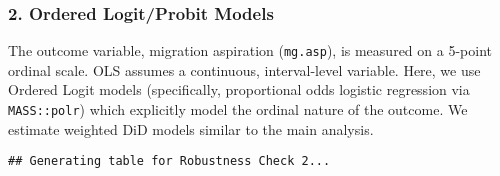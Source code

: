 \documentclass[
]{article}
\begin{document}
\subsubsection{2. Ordered Logit/Probit
Models}\label{ordered-logitprobit-models}

The outcome variable, migration aspiration (\texttt{mg.asp}), is
measured on a 5-point ordinal scale. OLS assumes a continuous,
interval-level variable. Here, we use Ordered Logit models
(specifically, proportional odds logistic regression via
\texttt{MASS::polr}) which explicitly model the ordinal nature of the
outcome. We estimate weighted DiD models similar to the main analysis.

\begin{verbatim}
## Generating table for Robustness Check 2...
\end{verbatim}
\end{document}
